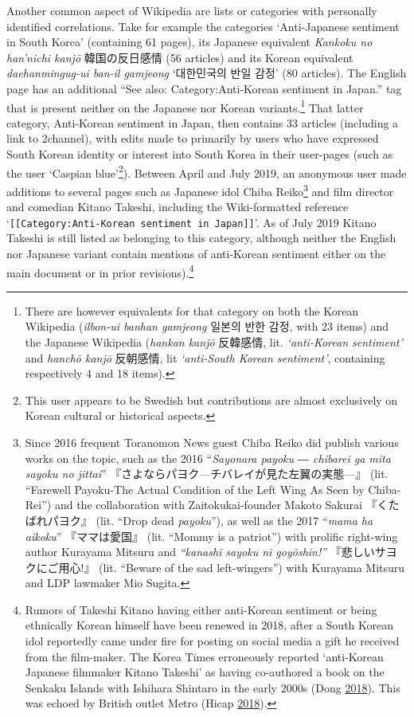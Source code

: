 \documentclass[10pt,british,A4paper,,openany]{memoir}
\begin{document}
Another common aspect of Wikipedia are lists or categories with
personally identified correlations. Take for example the categories
`Anti-Japanese sentiment in South Korea' (containing 61 pages), its
Japanese equivalent \emph{Kankoku no han'nichi kanjō} 韓国の反日感情 (56
articles) and its Korean equivalent \emph{daehanmingug-ui ban-il
gamjeong} `대한민국의 반일 감정' (80 articles). The English page has an
additional ``See also: Category:Anti-Korean sentiment in Japan.'' tag
that is present neither on the Japanese nor Korean variants.\footnote{There
  are however equivalents for that category on both the Korean Wikipedia
  (\emph{ilbon-ui banhan gamjeong} 일본의 반한 감정, with 23 items) and
  the Japanese Wikipedia (\emph{hankan kanjō} 反韓感情, lit.
  \emph{`anti-Korean sentiment'} and \emph{hanchō kanjō} 反朝感情, lit
  \emph{`anti-South Korean sentiment'}, containing respectively 4 and 18
  items).} That latter category, Anti-Korean sentiment in Japan, then
contains 33 articles (including a link to 2channel), with edits made to
primarily by users who have expressed South Korean identity or interest
into South Korea in their user-pages (such as the user `Caspian
blue'\footnote{This user appears to be Swedish but contributions are
  almost exclusively on Korean cultural or historical aspects.}).
Between April and July 2019‎, an anonymous user made additions to
several pages such as Japanese idol Chiba Reiko\footnote{Since 2016
  frequent Toranomon News guest Chiba Reiko did publish various works on
  the topic, such as the 2016 ``\emph{Sayonara payoku ― chibarei ga mita
  sayoku no jittai}'' 『さよならパヨク---チバレイが見た左翼の実態---』
  (lit. ``Farewell Payoku-The Actual Condition of the Left Wing As Seen
  by Chiba-Rei'') and the collaboration with Zaitokukai-founder Makoto
  Sakurai 『くたばれパヨク』 (lit. ``Drop dead \emph{payoku}''), as well
  as the 2017 ``\emph{mama ha aikoku}'' 『ママは愛国』 (lit. ``Mommy is
  a patriot'') with prolific right-wing author Kurayama Mitsuru and
  \emph{``kanashī sayoku ni goyōshin!''} 『悲しいサヨクにご用心!』 (lit.
  ``Beware of the sad left-wingers'') with Kurayama Mitsuru and LDP
  lawmaker Mio Sugita.} and film director and comedian Kitano Takeshi,
including the Wiki-formatted reference
`\texttt{[[Category:Anti-Korean sentiment in Japan]]}'. As of July 2019
Kitano Takeshi is still listed as belonging to this category, although
neither the English nor Japanese variant contain mentions of anti-Korean
sentiment either on the main document or in prior revisions).\footnote{Rumors
  of Takeshi Kitano having either anti-Korean sentiment or being
  ethnically Korean himself have been renewed in 2018, after a South
  Korean idol reportedly came under fire for posting on social media a
  gift he received from the film-maker. The Korea Times erroneously
  reported `anti-Korean Japanese filmmaker Kitano Takeshi' as having
  co-authored a book on the Senkaku Islands with Ishihara Shintaro in
  the early 2000s (Dong \protect\hyperlink{ref-dong_ikon_2018}{2018}).
  This was echoed by British outlet Metro (Hicap
  \protect\hyperlink{ref-hicap_ikons_2018}{2018}).}
\end{document}
